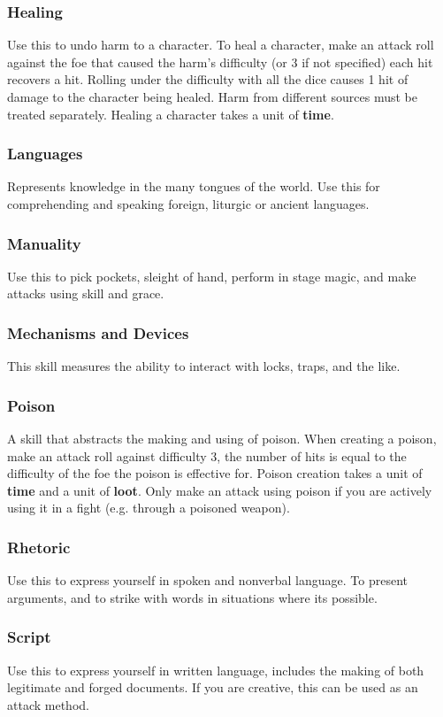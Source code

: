 \begin{multicols}{2}
\subsubsection*{Healing}
Use this to undo harm to a character. To heal a character, make an attack roll against the foe that caused the harm's difficulty (or 3 if not specified) each hit recovers a hit. Rolling under the difficulty with all the dice causes 1 hit of damage to the character being healed. Harm from different sources must be treated separately. Healing a character takes a unit of \textbf{time}.
\subsubsection*{Languages}
Represents knowledge in the many tongues of the world. Use this for comprehending and speaking foreign, liturgic or ancient languages.
\subsubsection*{Manuality}
Use this to pick pockets, sleight of hand, perform in stage magic, and make attacks using skill and grace.
\subsubsection*{Mechanisms and Devices}
This skill measures the ability to interact with locks, traps, and the like.
\subsubsection*{Poison}
A skill that abstracts the making and using of poison. When creating a poison, make an attack roll against difficulty 3, the number of hits is equal to the difficulty of the foe the poison is effective for. Poison creation takes a unit of \textbf{time} and a unit of \textbf{loot}. Only make an attack using poison if you are actively using it in a fight (e.g. through a poisoned weapon).
\subsubsection*{Rhetoric}
Use this to express yourself in spoken and nonverbal language. To present arguments, and to strike with words in situations where its possible.
\subsubsection*{Script}
Use this to express yourself in written language, includes the making of both legitimate and forged documents. If you are creative, this can be used as an attack method.

\end{multicols}
